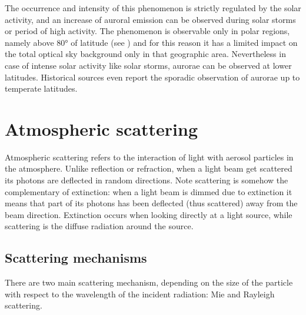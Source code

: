 The occurrence and intensity of this phenomenon is strictly regulated by the solar activity, and an increase of auroral emission can be observed during solar storms or period of high activity. The phenomenon is observable only in polar regions, namely above \ang{80} of latitude (see \cite{eather1969latitudinal}) and for this reason it has a limited impact on the total optical sky background only in that geographic area. Nevertheless in case of intense solar activity like solar storms, aurorae can be observed at lower latitudes. Historical sources even report the sporadic observation of aurorae up to temperate latitudes.


\section{Atmospheric scattering}
Atmospheric scattering refers to the interaction of light with aerosol particles in the atmosphere. Unlike reflection or refraction, when a light beam get scattered its photons are deflected in random directions. Note scattering is somehow the complementary of extinction: when a light beam is dimmed due to extinction it means that part of its photons has been deflected (thus scattered) away from the beam direction. Extinction occurs when looking directly at a light source, while scattering is the diffuse radiation around the source.

\subsection{Scattering mechanisms}
There are two main scattering mechanism, depending on the size of the particle with respect to the wavelength of the incident radiation: Mie and Rayleigh scattering.

